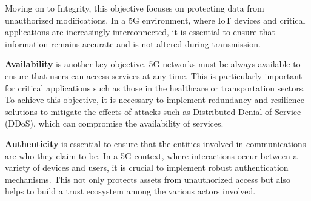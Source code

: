 \documentclass[english]{article}
\begin{document}
Moving on to Integrity, this objective focuses on protecting data from
unauthorized modifications. In a 5G environment, where IoT devices and critical
applications are increasingly interconnected, it is essential to ensure that
information remains accurate and is not altered during transmission.

\textbf{Availability} is another key objective. 5G networks must be always
available to ensure that users can access services at any time. This is
particularly important for critical applications such as those in the healthcare
or transportation sectors. To achieve this objective, it is necessary to implement
redundancy and resilience solutions to mitigate the effects of attacks such as
Distributed Denial of Service (DDoS), which can compromise the availability of services.

\textbf{Authenticity} is essential to ensure that the entities involved in
communications are who they claim to be. In a 5G context, where interactions
occur between a variety of devices and users, it is crucial to implement robust
authentication mechanisms. This not only protects assets from unauthorized
access but also helps to build a trust ecosystem among the various actors involved.
\end{document}
